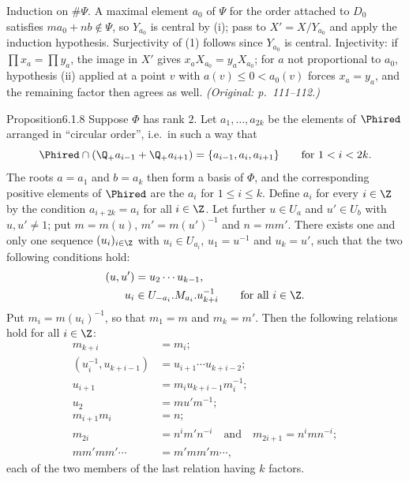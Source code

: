 \documentclass[12pt,a4paper,oneside,english]{smfart}
\makeatletter
\newcommand{\btanchor}[1]{\leavevmode\Hy@raisedlink{\hypertarget{bt:#1}{}}}
\theoremstyle{definition}
\theoremstyle{bt}
\makeatother
\begin{document}
\begin{sketch}
Induction on $\#\Psi$. A maximal element $a_0$ of $\Psi$ for the order attached
to $D_0$ satisfies $ma_0+nb\notin\Psi$, so $Y_{a_0}$ is central by (i); pass to
$X'=X/Y_{a_0}$ and apply the induction hypothesis. Surjectivity of (1) follows
since $Y_{a_0}$ is central. Injectivity: if $\prod x_a=\prod y_a$, the image in
$X'$ gives $x_aX_{a_0}=y_aX_{a_0}$; for $a$ not proportional to $a_0$, hypothesis
(ii) applied at a point $v$ with $a(v)\le0<a_0(v)$ forces $x_a=y_a$, and the
remaining factor then agrees as well. \emph{(Original: p.~111--112.)}
\end{sketch}

\begin{stmt}{Proposition}{6.1.8}\btanchor{6.1.8}
Suppose $\Phi$ has rank $2$. Let $a_1,\dots,a_{2k}$ be the elements of $\Phired$
arranged in ``circular order'', i.e.\ in such a way that
\[ \Phired\cap(\Q_{+}a_{i-1}+\Q_{+}a_{i+1})=\{a_{i-1},a_i,a_{i+1}\}
   \qquad\text{for }1<i<2k. \]
The roots $a=a_1$ and $b=a_k$ then form a basis of $\Phi$, and the corresponding
positive elements of $\Phired$ are the $a_i$ for $1\le i\le k$. Define $a_i$ for
every $i\in\Z$ by the condition $a_{i+2k}=a_i$ for all $i\in\Z$. Let further
$u\in U_a$ and $u'\in U_b$ with $u,u'\ne 1$; put $m=m(u)$, $m'=m(u')^{-1}$ and
$n=mm'$. There exists one and only one sequence $(u_i)_{i\in\Z}$ with
$u_i\in U_{a_i}$, $u_1=u^{-1}$ and $u_k=u'$, such that the two following
conditions hold:
\begin{align}
(u,u')&=u_2\cdots u_{k-1},\\
u_i&\in U_{-a_i}.M_{a_i}.u_{k+i}^{-1}\qquad\text{for all }i\in\Z.
\end{align}
Put $m_i=m(u_i)^{-1}$, so that $m_1=m$ and $m_k=m'$. Then the following relations
hold for all $i\in\Z$:
\begin{align}
m_{k+i}&=m_i;\\
(u_i^{-1},u_{k+i-1})&=u_{i+1}\cdots u_{k+i-2};\\
u_{i+1}&=m_iu_{k+i-1}m_i^{-1};\\
u_2&=mu'm^{-1};\\
m_{i+1}m_i&=n;\\
m_{2i}&=n^{i}m'n^{-i}\quad\text{and}\quad m_{2i+1}=n^{i}mn^{-i};\\
mm'mm'\cdots&=m'mm'm\cdots,
\end{align}
each of the two members of the last relation having $k$ factors.
\end{stmt}
\end{document}
